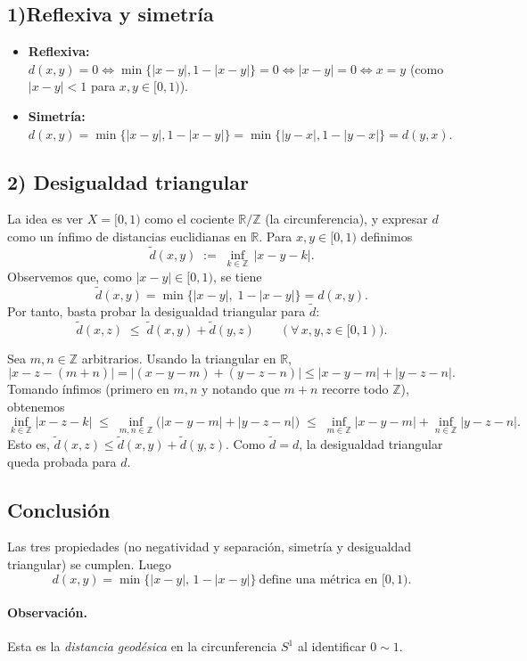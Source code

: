 \documentclass[12pt]{article}
\begin{document}
\subsection*{1)Reflexiva y simetría}
\begin{itemize}
\item \textbf{Reflexiva:} $d(x,y)=0\iff \min\{|x-y|,1-|x-y|\}=0\iff |x-y|=0 \iff x=y$ (como $|x-y|<1$ para $x,y\in[0,1)$).
\item \textbf{Simetría:} $d(x,y)=\min\{|x-y|,1-|x-y|\}=\min\{|y-x|,1-|y-x|\}=d(y,x)$.
\end{itemize}

\subsection*{2) Desigualdad triangular}
La idea es ver $X=[0,1)$ como el cociente $\mathbb{R}/\mathbb{Z}$ (la circunferencia), y expresar $d$ como un ínfimo de distancias euclidianas en $\mathbb{R}$. Para $x,y\in[0,1)$ definimos
\[
\tilde d(x,y)\;:=\;\inf_{k\in\mathbb{Z}}\,|x-y-k|.
\]
Observemos que, como $|x-y|\in[0,1)$, se tiene
\[
\tilde d(x,y)=\min\{|x-y|,\;1-|x-y|\}=d(x,y).
\]
Por tanto, basta probar la desigualdad triangular para $\tilde d$:
\[
\tilde d(x,z)\;\le\;\tilde d(x,y)+\tilde d(y,z)\qquad(\forall\,x,y,z\in[0,1)).
\]

Sea $m,n\in\mathbb{Z}$ arbitrarios. Usando la triangular en $\mathbb{R}$,
\[
|x-z-(m+n)|
= |(x-y-m)+(y-z-n)|
\le |x-y-m| + |y-z-n|.
\]
Tomando ínfimos (primero en $m,n$ y notando que $m+n$ recorre todo $\mathbb{Z}$), obtenemos
\[
\inf_{k\in\mathbb{Z}}|x-z-k|
\;\le\;
\inf_{m,n\in\mathbb{Z}}\big(|x-y-m|+|y-z-n|\big)
\;\le\;
\inf_{m\in\mathbb{Z}}|x-y-m|+\inf_{n\in\mathbb{Z}}|y-z-n|.
\]
Esto es, \(\tilde d(x,z)\le \tilde d(x,y)+\tilde d(y,z)\). Como $\tilde d=d$, la desigualdad triangular queda probada para $d$.

\subsection*{Conclusión}
Las tres propiedades (no negatividad y separación, simetría y desigualdad triangular) se cumplen. Luego
\[
\boxed{\,d(x,y)=\min\{|x-y|,\,1-|x-y|\}\ \text{define una métrica en }[0,1).\,}
\]

\paragraph{Observación.}
Esta es la \emph{distancia geodésica} en la circunferencia $S^1$ al identificar $0\sim 1$. 
\end{document}
